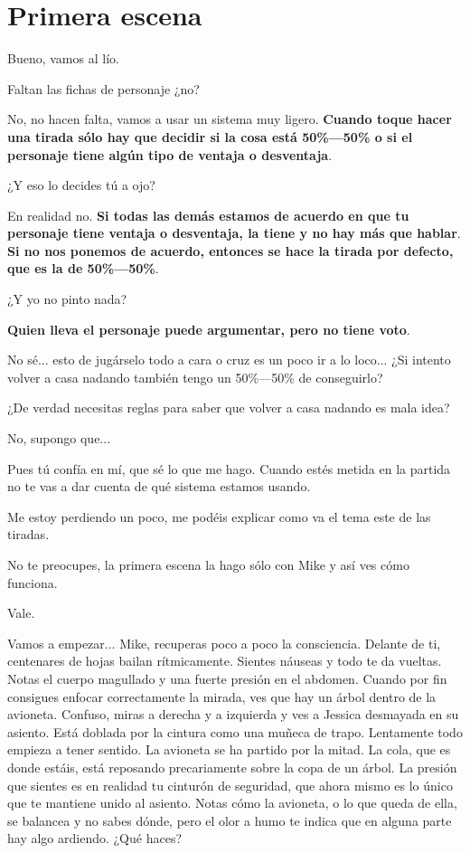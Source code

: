 \documentclass[10pt, a5paper, twocolumn]{article}
\newenvironment{dialogue}
    {\begin{description}[leftmargin=!,align=right,labelwidth=0.cm]}
    {\end{description}}
\newcommand\A{\item[\raisebox{-0.25em}{\scalebox{0.75}{\bctetraedre}}]}
\newcommand\B{\item[\raisebox{-0.25em}{\scalebox{0.75}{\bccube}}]}
\newcommand\E{\item[\raisebox{-0.25em}{\scalebox{0.75}{\bcicosaedre}}]}
\begin{document}
    \section*{Primera escena} %

    \begin{dialogue}
        \E Bueno, vamos al lío.
        \B Faltan las fichas de personaje ¿no?
        \E No, no hacen falta, vamos a usar un sistema muy ligero. \textbf{Cuando toque hacer una tirada sólo hay que decidir si la cosa está 50$\!$\%---50$\!$\% o si el personaje tiene algún tipo de ventaja o desventaja}.
        \B ¿Y eso lo decides tú a ojo?
        \E En realidad no. \textbf{Si todas las demás estamos de acuerdo en que tu personaje tiene ventaja o desventaja, la tiene y no hay más que hablar}. \textbf{Si no nos ponemos de acuerdo, entonces se hace la tirada por defecto, que es la de 50$\!$\%---50$\!$\%}.
        \B ¿Y yo no pinto nada?
        \E \textbf{Quien lleva el personaje puede argumentar, pero no tiene voto}.
        \B No sé... esto de jugárselo todo a cara o cruz es un poco ir a lo loco... ¿Si intento volver a casa nadando también tengo un 50$\!$\%---50$\!$\% de conseguirlo?
        \E ¿De verdad necesitas reglas para saber que volver a casa nadando es mala idea?
        \B No, supongo que...
        \E Pues tú confía en mí, que sé lo que me hago. Cuando estés metida en la partida no te vas a dar cuenta de qué sistema estamos usando.
        \A Me estoy perdiendo un poco, me podéis explicar como va el tema este de las tiradas.
        \E No te preocupes, la primera escena la hago sólo con Mike y así ves cómo funciona.
        \A Vale.
        \E Vamos a empezar... Mike, recuperas poco a poco la consciencia. Delante de ti, centenares de hojas bailan rítmicamente. Sientes náuseas y todo te da vueltas. Notas el cuerpo magullado y una fuerte presión en el abdomen. Cuando por fin consigues enfocar correctamente la mirada, ves que hay un árbol dentro de la avioneta. Confuso, miras a derecha y a izquierda y ves a Jessica desmayada en su asiento. Está doblada por la cintura como una muñeca de trapo. Lentamente todo empieza a tener sentido. La avioneta se ha partido por la mitad. La cola, que es donde estáis, está reposando precariamente sobre la copa de un árbol. La presión que sientes es en realidad tu cinturón de seguridad, que ahora mismo es lo único que te mantiene unido al asiento. Notas cómo la avioneta, o lo que queda de ella, se balancea y no sabes dónde, pero el olor a humo te indica que en alguna parte hay algo ardiendo. ¿Qué haces?

\end{dialogue}
\end{document}
